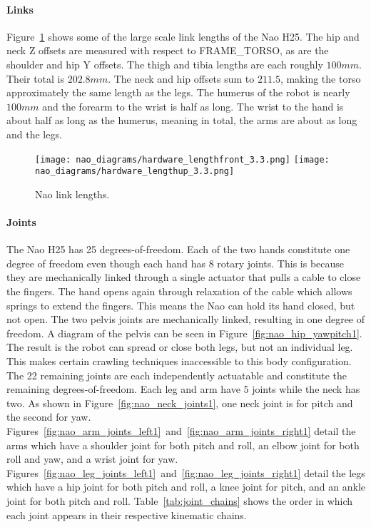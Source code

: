 \paragraph{Links}
Figure~\ref{fig:nao_link_lengths1} shows some of the large scale link lengths
of the Nao H25. The hip and neck Z offsets are measured with respect to
FRAME\_TORSO, as are the shoulder and hip Y offsets. The thigh and tibia lengths
are each roughly $100 mm$. Their total is $202.8 mm$. The neck and hip offsets
sum to $211.5$, making the torso approximately the same length as the legs.
The humerus of the robot is nearly $100 mm$ and the forearm to the wrist
is half as long. The wrist to the hand is about half as long as the
humerus, meaning in total, the arms are about as long and the legs.

\begin{figure}
\centerline{\texttt{[image: nao\_diagrams/hardware\_lengthfront\_3.3.png]}
            \texttt{[image: nao\_diagrams/hardware\_lengthup\_3.3.png]}
}
\caption{Nao link lengths.}
\label{fig:nao_link_lengths1}
\end{figure}

\paragraph{Joints}
The Nao H25 has 25 degrees-of-freedom. Each of the two hands constitute one degree
of freedom even though each hand has 8 rotary joints. This is because they are
mechanically linked through a single actuator that pulls a cable to close the
fingers. The hand opens again through relaxation of the cable which allows springs
to extend the fingers. This means the Nao can hold its hand closed, but not open.
The two pelvis joints are mechanically linked, resulting in one degree
of freedom. A diagram of the pelvis can be seen in Figure~\ref{fig:nao_hip_yawpitch1}.
The result is the robot can spread or close both legs, but not an
individual leg. This makes certain crawling techniques inaccessible to this
body configuration.
The 22 remaining joints are each independently actuatable and constitute the
remaining degrees-of-freedom. Each leg and arm have 5 joints while the neck has
two. As shown in Figure~\ref{fig:nao_neck_joints1}, one neck joint is for pitch
and the second for yaw.
Figures~\ref{fig:nao_arm_joints_left1}~and~\ref{fig:nao_arm_joints_right1}
detail the arms which have a shoulder joint for both pitch and roll, an elbow
joint for both roll and yaw, and a wrist joint for yaw.
Figures~\ref{fig:nao_leg_joints_left1}~and~\ref{fig:nao_leg_joints_right1}
detail the legs which have a hip joint for both pitch and roll, a knee joint
for pitch, and an ankle joint for both pitch and roll.
Table~\ref{tab:joint_chains} shows the order in which each joint appears
in their respective kinematic chains.

